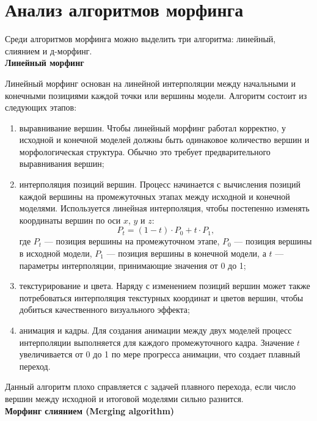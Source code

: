 \section{Анализ алгоритмов морфинга}

Среди алгоритмов морфинга можно выделить три алгоритма: линейный, слиянием и д-морфинг.\\

\textbf{Линейный морфинг}

Линейный морфинг основан на линейной интерполяции между начальными и конечными позициями каждой точки или вершины модели. Алгоритм состоит из следующих этапов:

\begin{enumerate}[label={\arabic*)}]
	\item выравнивание вершин. Чтобы линейный морфинг работал корректно, у исходной и конечной моделей должны быть одинаковое количество вершин и морфологическая структура. Обычно это требует предварительного выравнивания вершин;
	\item интерполяция позиций вершин. Процесс начинается с вычисления позиций каждой вершины на промежуточных этапах между исходной и конечной моделями. Используется линейная интерполяция, чтобы постепенно изменять координаты вершин по оси $x$, $y$ и $z$:
	\begin{equation}
		P_{t} = (1 - t) \cdot P_{0} + t \cdot P_{1},
	\end{equation}
	где \( P_{t} \) --- позиция вершины на промежуточном этапе, \( P_{0} \) --- позиция вершины в исходной модели, \( P_{1} \) --- позиция вершины в конечной модели, а \( t \) --- параметры интерполяции, принимающие значения от 0 до 1;
	\item текстурирование и цвета. Наряду с изменением позиций вершин может также потребоваться интерполяция текстурных координат и цветов вершин, чтобы добиться качественного визуального эффекта;
	\item анимация и кадры. Для создания анимации между двух моделей процесс интерполяции выполняется для каждого промежуточного кадра. Значение \( t \) увеличивается от 0 до 1 по мере прогресса анимации, что создает плавный переход.
\end{enumerate}

Данный алгоритм плохо справляется с задачей плавного перехода, если число вершин между исходной и итоговой моделями сильно разнится.~\cite{LinearMorph} \\

\textbf{Морфинг слиянием (Merging algorithm)}

